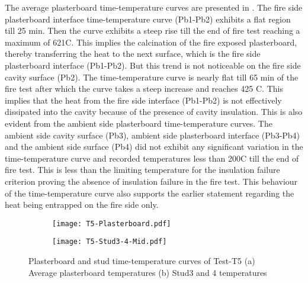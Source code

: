 The average plasterboard time-temperature curves are presented in . The fire side plasterboard interface time-temperature curve (Pb1-Pb2) exhibits a flat region till 25 min. Then the curve exhibits a steep rise till the end of fire test reaching a maximum of 621\degree C. This implies the calcination of the fire exposed plasterboard, thereby transferring the heat to the next surface, which is the fire side plasterboard interface (Pb1-Pb2). But this trend is not noticeable on the fire side cavity surface (Pb2). The time-temperature curve is nearly flat till 65 min of the fire test after which the curve takes a steep increase and reaches 425 \degree C. This implies that the heat from the fire side interface (Pb1-Pb2) is not effectively dissipated into the cavity because of the presence of cavity insulation. This is also evident from the ambient side plasterboard time-temperature curves. The ambient side cavity surface (Pb3), ambient side plasterboard interface (Pb3-Pb4) and the ambient side surface (Pb4) did not exhibit any significant variation in the time-temperature curve and recorded temperatures less than 200\degree C till the end of fire test. This is less than the limiting temperature for the insulation failure criterion proving the absence of insulation failure in the fire test. This behaviour of the time-temperature curve also supports the earlier statement regarding the heat being entrapped on the fire side only.
\begin{figure}[!htbp]
	\centering
	\begin{subfigure}[b]{0.7\textwidth}
		\centering
		\texttt{[image: T5-Plasterboard.pdf]}
		\caption{}
		\label{subfig:T5-Plasterboard}
	\end{subfigure}
	\begin{subfigure}[b]{0.7\textwidth}
		\centering
		\texttt{[image: T5-Stud3-4-Mid.pdf]}
		\caption{}
		\label{subfig:T5-Stud3-4-Top}
	\end{subfigure}
	   \caption{Plasterboard and stud time-temperature curves of Test-T5 (a) Average plasterboard temperatures (b) Stud3 and 4 temperatures}
	   \label{fig:T5-PB-Stud}
\end{figure}

